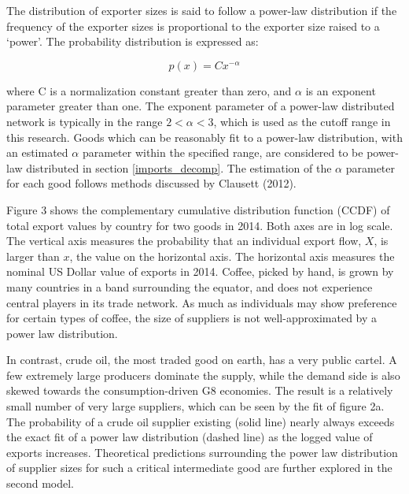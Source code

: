 \documentclass[10pt,letterpaper,pdftex]{article}
\begin{document}
The distribution of exporter sizes is said to follow a power-law distribution if the frequency of the exporter sizes is proportional to the exporter size raised to a `power'. The probability distribution is expressed as:

\begin{equation}
p(x) = Cx^{-\alpha}
\end{equation}

where C is a normalization constant greater than zero, and $\alpha$ is an exponent parameter greater than one. The exponent parameter of a power-law distributed network is typically in the range $2 < \alpha < 3$, which is used as the cutoff range in this research. Goods which can be reasonably fit to a power-law distribution, with an estimated $\alpha$ parameter within the specified range, are considered to be power-law distributed in section \ref{imports_decomp}. The estimation of the $\alpha$ parameter for each good follows methods discussed by Clausett (2012).

Figure 3 shows the complementary cumulative distribution function (CCDF) of total export values by country for two goods in 2014. Both axes are in log scale. The vertical axis measures the probability that an individual export flow, $X$, is larger than $x$, the value on the horizontal axis. The horizontal axis measures the nominal US Dollar value of exports in 2014. Coffee, picked by hand, is grown by many countries in a band surrounding the equator, and does not experience central players in its trade network. As much as individuals may show preference for certain types of coffee, the size of suppliers is not well-approximated by a power law distribution. 

In contrast, crude oil, the most traded good on earth, has a very public cartel. A few extremely large producers dominate the supply, while the demand side is also skewed towards the consumption-driven G8 economies. The result is a relatively small number of very large suppliers, which can be seen by the fit of figure 2a. The probability of a crude oil supplier existing (solid line) nearly always exceeds the exact fit of a power law distribution (dashed line) as the logged value of exports increases. Theoretical predictions surrounding the power law distribution of supplier sizes for such a critical intermediate good are further explored in the second model. 
\end{document}
